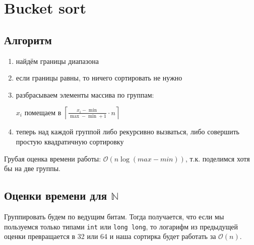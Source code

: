 \documentclass[10pt,a4paper]{article}
\renewcommand{\O}{\mathcal{O}}
\begin{document}
\section{Bucket sort}

\subsection{Алгоритм}

\begin{enumerate}
\item найдём границы диапазона
\item если границы равны, то ничего сортировать не нужно
\item разбрасываем элементы массива по группам:

$x_i$ помещаем в $\left\lceil\frac{x_i - \min}{\max - \min + 1} \cdot n \right\rceil$

\item теперь над каждой группой либо рекурсивно вызваться, либо совершить 
простую квадратичную сортировку
\end{enumerate}

Грубая оценка времени работы: $\O(n \log (max - min))$, т.к. поделимся хотя 
бы на две группы.

\subsection{Оценки времени для $\mathbb{N}$}

Группировать будем по ведущим битам. Тогда получается, что если мы пользуемся
только типами \lstinline|int| или \lstinline|long long|, то логарифм из предыдущей
оценки превращается в 32 или 64 и наша сортирка будет работать за $\O(n)$.
\end{document}
